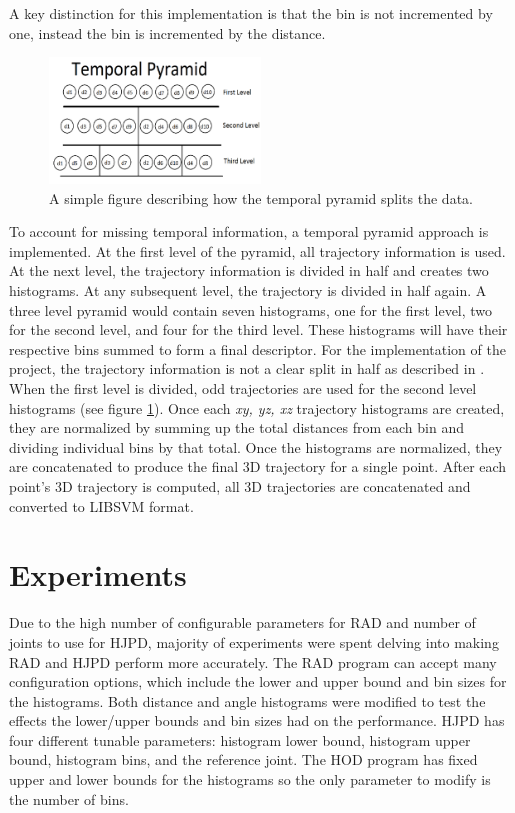 \documentclass[11pt,nocopyrightspace]{config}
\begin{document}
A key distinction for this implementation is that the bin is not incremented by one, instead the bin is incremented by the distance.

\begin{figure}
	\centering
	\includegraphics[width=0.5\textwidth]{temporal_pyramid2}
	\caption{A simple figure describing how the temporal pyramid splits the data.}
	\label{fig:hodPyramid}
\end{figure}

To account for missing temporal information, a temporal pyramid approach is implemented. At the first level of the pyramid, all trajectory information is used. At the next level, the trajectory information is divided in half and creates two histograms.  At any subsequent level, the trajectory is divided in half again. A three level pyramid would contain seven histograms, one for the first level, two for the second level, and four for the third level. These histograms will have their respective bins summed to form a final descriptor. For the implementation of the project, the trajectory information is not a clear split in half as described in \cite{hodPaper}. When the first level is divided, odd trajectories are used for the second level histograms (see figure \ref{fig:hodPyramid}). Once each \emph{xy, yz, xz} trajectory histograms are created, they are normalized by summing up the total distances from each bin and dividing individual bins by that total. Once the histograms are normalized, they are concatenated to produce the final 3D trajectory for a single point. After each point's 3D trajectory is computed, all 3D trajectories are concatenated and converted to LIBSVM format.

\section{Experiments}

Due to the high number of configurable parameters for RAD and number of joints to use for HJPD, majority of experiments were spent delving into making RAD and HJPD perform more accurately. The RAD program can accept many configuration options, which include the lower and upper bound and bin sizes for the histograms. Both distance and angle histograms were modified to test the effects the lower/upper bounds and bin sizes had on the performance. HJPD has four different tunable parameters: histogram lower bound, histogram upper bound, histogram bins, and the reference joint. The HOD program has fixed upper and lower bounds for the histograms so the only parameter to modify is the number of bins.
\end{document}
